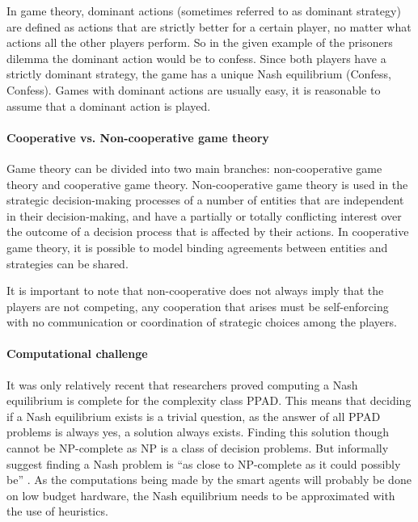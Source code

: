 In game theory, dominant actions (sometimes referred to as dominant strategy) are defined as actions that are strictly better for a certain player, no matter what actions all the other players perform. So in the given example of the prisoners dilemma the dominant action would be to confess. Since both players have a strictly dominant strategy, the game has a unique Nash equilibrium (Confess, Confess). Games with dominant actions are usually easy, it is reasonable to assume that a dominant action is played. 

\paragraph{Cooperative vs. Non-cooperative game theory} 
Game theory can be divided into two main branches: non-cooperative game theory and cooperative game theory. Non-cooperative game theory is used in the strategic decision-making processes of a number of entities that are independent in their decision-making, and have a partially or totally conflicting interest over the outcome of a decision process that is affected by their actions\cite{keypaper}. In cooperative game theory, it is possible to model binding agreements between entities and strategies can be shared. 

It is important to note that non-cooperative does not always imply that the players are not competing, any cooperation that arises must be self-enforcing with no communication or coordination of strategic choices among the players.

\paragraph{Computational challenge} 
It was only relatively recent that researchers proved computing a Nash equilibrium is complete for the complexity class PPAD\cite{daskalakis2009complexity}. This means that deciding if a Nash equilibrium exists is a trivial question, as the answer of all PPAD problems is always yes, a solution always exists. Finding this solution though cannot be NP-complete as NP is a class of decision problems. But \cite{daskalakis2009complexity} informally suggest finding a Nash problem is ``as close to NP-complete as it could possibly be'' \cite{daskalakis2009complexity, Aaronson2012}. 
As the computations being made by the smart agents will probably be done on low budget hardware, the Nash equilibrium needs to be  approximated with the use of heuristics. \cite{MicrogridModellingPetrosAristidou,AumannGameTheoryAccomplish} 

